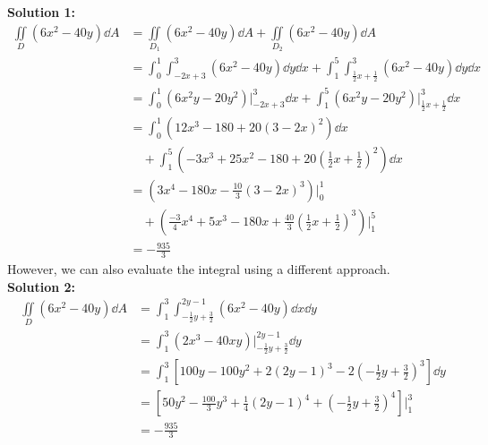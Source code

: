 {    \textbf{Solution 1:}
    \begin{align*}
        \iint \limits_{D} (6x^2 - 40y) \dd{A} &= \iint \limits_{D_1} (6x^2-40y) \dd{A} + \iint \limits_{D_2} (6x^2-40y) \dd{A} \\
                                              &= \int_{0}^{1} \int_{-2x+3}^{3} (6x^2-40y) \dd{y} \dd{x} + \int_{1}^{5} \int_{\frac{1}{2}x+\frac{1}{2}}^{3} (6x^2-40y) \dd{y} \dd{x} \\
                                              &= \int_{0}^{1} (6x^2y-20y^2)\Bigr|_{-2x+3}^{3} \dd{x} + \int_{1}^{5} (6x^2y-20y^2)\Bigr|_{\frac{1}{2}x+\frac{1}{2}}^{3} \dd{x} \\
                                              &= \int_{0}^{1} (12x^3 - 180 + 20(3-2x)^2) \dd{x} \\
                                              &\quad+ \int_{1}^{5} \left( -3x^3 + 25x^2 - 180 + 20 \left( \frac{1}{2}x + \frac{1}{2} \right)^2 \right) \dd{x} \\
                                              &= \left( 3x^4 - 180x - \frac{10}{3} (3-2x)^3 \right)\Biggr|_{0}^{1} \\
                                              &\quad+ \left( \frac{-3}{4}x^4 + 5x^3 - 180x + \frac{40}{3} \left( \frac{1}{2}x + \frac{1}{2} \right)^3 \right)\Biggr|_{1}^{5} \\
                                              &= -\frac{935}{3}
    \end{align*}
    However, we can also evaluate the integral using a different approach. \\
    \textbf{Solution 2:}
    \begin{align*}
        \iint \limits_{D} (6x^2-40y) \dd{A} &= \int_{1}^{3} \int_{-\frac{1}{2}y+\frac{3}{2}}^{2y-1} (6x^2-40y) \dd{x} \dd{y} \\
                                            &= \int_{1}^{3} (2x^3 - 40xy) \Bigr|_{-\frac{1}{2}y+\frac{3}{2}}^{2y-1} \dd{y} \\
                                            &= \int_{1}^{3} \left[ 100y - 100y^2 + 2(2y-1)^3 - 2 \left( - \frac{1}{2}y + \frac{3}{2} \right)^3 \right] \dd{y} \\
                                            &= \left[ 50y^2 - \frac{100}{3}y^3 + \frac{1}{4}(2y-1)^4 + \left( - \frac{1}{2}y + \frac{3}{2} \right)^4 \right]\Biggr|_{1}^{3} \\
                                            &= -\frac{935}{3}
    \end{align*}
}

